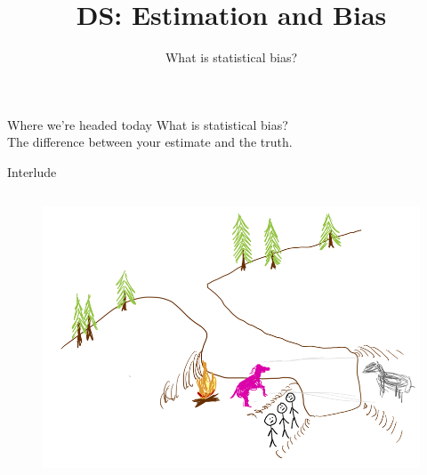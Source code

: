 \documentclass[aspectratio=169]{../latex_main/tntbeamer}  %
\title[Statistics]{DS: Estimation and Bias}
\subtitle{What is statistical bias?}
\begin{document}
	
	\maketitle
	
	\begin{frame}[c]{Where we’re headed today}
	    What is statistical bias?\\
	    \hspace{4cm} The difference between your estimate and the truth.

	\end{frame}
	
		\begin{frame}{Interlude}
	    \begin{columns}
	        \begin{column}{.5\textwidth}
	     
	           \begin{figure}
	               \includegraphics[scale=.55]{Bild24}
	           \end{figure}
	        \end{column}
	        

\end{columns}
\end{frame}
\end{document}
